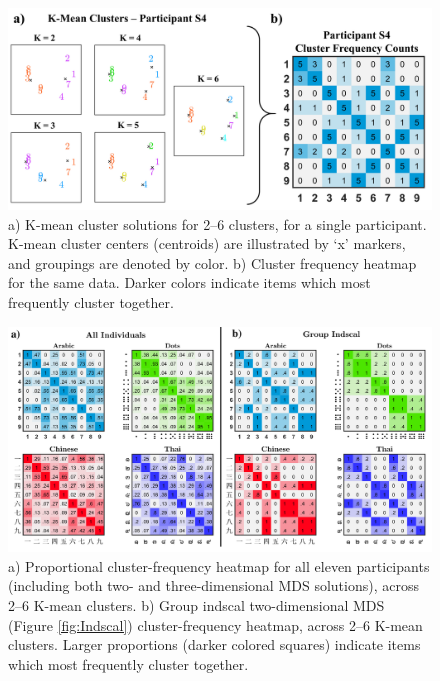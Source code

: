 \begin{figure}[tbh]
\centering \includegraphics[scale = .45]{Figures/Wheel/ClusterExplainer.jpg}
\caption{a) K-mean cluster solutions for 2--6 clusters, for a single participant. K-mean cluster centers (centroids) are illustrated by `x' markers, and groupings are denoted by color. b) Cluster frequency heatmap for the same data. Darker colors indicate items which most frequently cluster together.}
\label{fig:Kmean}
\end{figure}

\begin{figure}[tbh]
\centering \includegraphics[width=\linewidth]{Figures/Wheel/IndivVsIndscalHeatmap.pdf}
\caption{a) Proportional cluster-frequency heatmap for all eleven participants (including both two- and three-dimensional MDS solutions), across 2--6 K-mean clusters. b) Group indscal two-dimensional MDS (Figure \ref{fig:Indscal}) cluster-frequency heatmap, across 2--6 K-mean clusters. Larger proportions (darker colored squares) indicate items which most frequently cluster together.}
\label{fig:HeatMapSubjects}
\end{figure}

